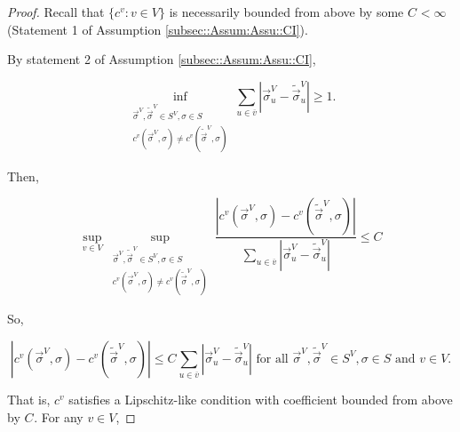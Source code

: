 \documentclass[12pt]{article}
\newcommand{\ov}{\overline}
\newcommand{\te}{\text}
\newcommand{\ind}{\hspace{24pt}}
\renewcommand{\v}{v}							%
\newcommand{\vv}{u}								%
\renewcommand{\S}{S}							%
\newcommand{\s}{\sigma}							%
\newcommand{\sv}{\vec{\s}}						%
\newcommand{\IGr}{c}							%
\newcommand{\vind}[1]{^{#1}}					%
\newcommand{\carp}[1]{^{#1}}					%
\newcommand{\vsi}[1]{^{#1}}						%
\newcommand{\cind}[1]{_{#1}}					%
\newcommand{\cl}{\ov}							%
\newcommand{\const}{C}							%
\newcommand{\alt}[1]{\widetilde{#1}}			%
\newcommand{\indx}[1]{_{#1}}					%
\begin{document}
\begin{proof}
Recall that \(\{\IGr\vind{\v}:\v\in V\}\) is necessarily bounded from above by some \(\const\indx{} < \infty\) (Statement 1 of Assumption \ref{subsec::Assum:Assu::CI}). 

\ind By statement 2 of Assumption \ref{subsec::Assum:Assu::CI}, 

\[\inf_{\substack{\sv\cind{}\vsi{V},\alt{\sv}\cind{}\vsi{V} \in \S\carp{V}, \s\in \S\\ \IGr\vind{\v}(\sv\cind{}\vsi{V},\s) \neq \IGr\vind{\v}(\alt{\sv}\cind{}\vsi{V},\s)}} \sum_{\vv \in \cl{\v}} |\sv\cind{\vv}\vsi{V} - \alt{\sv}\cind{\vv}\vsi{V}| \geq 1.\]

Then,

\[\sup_{\v\in V} \sup_{\substack{\sv\cind{}\vsi{V},\alt{\sv}\cind{}\vsi{V} \in \S\carp{V}, \s\in \S\\ \IGr\vind{\v}(\sv\cind{}\vsi{V},\s) \neq \IGr\vind{\v}(\alt{\sv}\cind{}\vsi{V},\s)}} \frac{|\IGr\vind{\v}(\sv\cind{}\vsi{V},\s) - \IGr\vind{\v}(\alt{\sv}\cind{}\vsi{V},\s)|}{\sum_{\vv \in \cl{\v}} |\sv\cind{\vv}\vsi{V} - \alt{\sv}\cind{\vv}\vsi{V}|} \leq \const\indx{}\]

So,

\[|\IGr\vind{\v}(\sv\cind{}\vsi{V},\s) - \IGr\vind{\v}(\alt{\sv}\cind{}\vsi{V},\s)|\leq \const\indx{}\sum_{\vv \in \cl{\v}} |\sv\cind{\vv}\vsi{V} - \alt{\sv}\cind{\vv}\vsi{V}| \te{ for all } \sv\cind{}\vsi{V},\alt{\sv}\cind{}\vsi{V}\in \S\carp{V},\s\in \S\te{ and }\v\in V.\]

That is, \(\IGr\vind{\v}\) satisfies a Lipschitz-like condition with coefficient bounded from above by \(\const\indx{}\). For any \(\v\in V\),


\end{proof}
\end{document}
